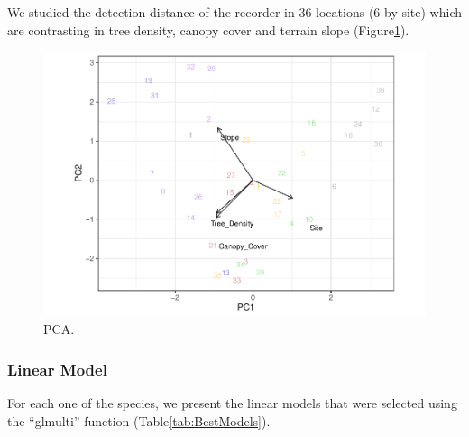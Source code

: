 \documentclass[fleqn,10pt,lineno]{wlpeerj} %
\begin{document}
We studied the detection distance of the recorder in 36 locations (6 by
site) which are contrasting in tree density, canopy cover and terrain
slope (Figure\ref{fig:PCAplot}).

\begin{figure}

{\centering \includegraphics[width=1\linewidth]{ASR_MyPaper_2020_files/figure-latex/PCAplot-1} 

}

\caption{PCA.\label{fig:PCAplot}}\label{fig:PCAplot}
\end{figure}

\hypertarget{linear-model}{%
\subsubsection*{Linear Model}\label{linear-model}}

For each one of the species, we present the linear models that were
selected using the ``glmulti'' function (Table\ref{tab:BestModels}).
\end{document}

